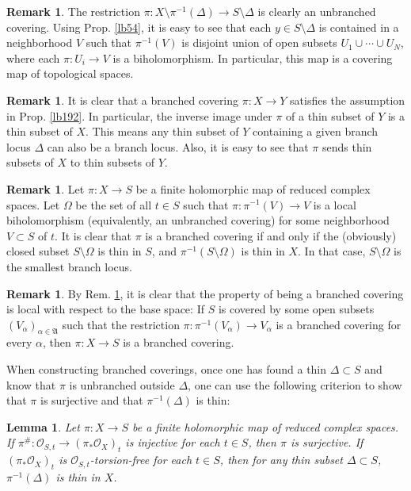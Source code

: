 \documentclass[12pt,b5paper,notitlepage]{report}
\theoremstyle{definition}
\newtheorem{rem}[df]{Remark}
\theoremstyle{plain}
\newtheorem{lm}[df]{Lemma}
\newcommand{\fk}{\mathfrak}
\newcommand{\scr}{\mathscr}
\numberwithin{equation}{section}
\begin{document}
\begin{rem}
The restriction $\pi:X\setminus\pi^{-1}(\Delta)\rightarrow S\setminus \Delta$ is clearly an unbranched covering. Using Prop. \ref{lb54}, it is easy to see that each $y\in S\setminus \Delta$ is contained in a neighborhood $V$ such that $\pi^{-1}(V)$ is disjoint union of open subsets $U_1\cup\cdots\cup U_N$, where each $\pi:U_i\rightarrow V$ is a biholomorphism. In particular, this map is a covering map of topological spaces.
\end{rem}


\begin{rem}\label{lb209}
It is clear that a branched covering $\pi:X\rightarrow Y$ satisfies the assumption in Prop. \ref{lb192}. In particular, the inverse image under $\pi$ of a thin subset of $Y$ is a thin subset of $X$. This means any thin subset of $Y$ containing a given branch locus $\Delta$ can also be a branch locus. Also, it is easy to see that $\pi$ sends thin subsets of $X$ to thin subsets of $Y$.   
\end{rem}


\begin{rem}\label{lb199}
Let $\pi:X\rightarrow S$ be a finite holomorphic map of reduced complex spaces. Let $\Omega$ be the set of all $t\in S$ such that $\pi:\pi^{-1}(V)\rightarrow V$ is a local biholomorphism (equivalently, an unbranched covering) for some neighborhood $V\subset S$ of $t$. It is clear that $\pi$ is a branched covering if and only if the (obviously) closed subset $S\setminus\Omega$ is thin in $S$, and $\pi^{-1}(S\setminus\Omega)$ is thin in $X$. In that case, $S\setminus\Omega$ is the smallest branch locus.
\end{rem}


\begin{rem}\label{lb200}
By Rem. \ref{lb199}, it is clear that the property of being a branched covering is local with respect to the base space: If $S$ is covered by some open subsets $(V_\alpha)_{\alpha\in\fk A}$ such that the restriction $\pi:\pi^{-1}(V_\alpha)\rightarrow V_\alpha$ is a branched covering for every $\alpha$, then $\pi:X\rightarrow S$ is a branched covering.
\end{rem}

When constructing branched coverings, once one has found a thin $\Delta\subset S$ and know that $\pi$ is unbranched outside $\Delta$, one can use the following criterion to show that $\pi$ is surjective and that $\pi^{-1}(\Delta)$ is thin:


\begin{lm}\label{lb230}
Let $\pi:X\rightarrow S$ be a finite holomorphic map of reduced complex spaces. If $\pi^\#:\scr O_{S,t}\rightarrow(\pi_*\scr O_X)_t$ is injective for each $t\in S$, then $\pi$ is surjective. If $(\pi_*\scr O_X)_t$ is $\scr O_{S,t}$-torsion-free for each $t\in S$, then for any thin subset $\Delta\subset S$, $\pi^{-1}(\Delta)$ is thin in $X$.
\end{lm}
\end{document}
